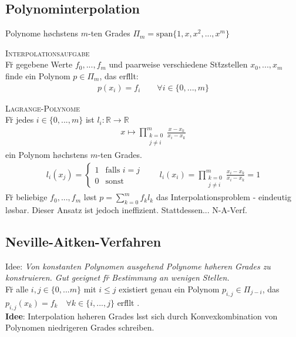 \subsection{Polynominterpolation}
Polynome h\o chstens $m$-ten Grades $\Pi_m = \text{span}\{1,x,x^2,...,x^m\}$

\textsc{Interpolationsaufgabe}\\
F\u r gegebene Werte $f_0, ..., f_m$ und paarweise verschiedene St\u tzstellen $x_0, ..., x_m$ finde ein Polynom $p \in \Pi_m$, das erf\u llt:
\begin{align*}
p(x_i)=f_i \qquad \forall i\in \{0,...,m\}
\end{align*}\vspace{0.2cm}

\textsc{Lagrange-Polynome}\\
F\u r jedes $i \in \{0,...,m\}$ ist $l_i : \mathbb{R} \rightarrow \mathbb{R}$
\begin{align*}
x \mapsto \prod_{\substack{k=0 \\ j\neq i}}^m \frac{x-x_k}{x_i - x_k}
\end{align*}
ein Polynom h\o chstens $m$-ten Grades. 
\begin{align*}
l_i(x_j) = \begin{cases}
1 & \text{falls } i=j \\
0 & \text{sonst}
\end{cases}
\qquad 
l_i(x_i) = \prod_{\substack{k=0 \\ j\neq i}}^m \frac{x_i-x_k}{x_i - x_k} = 1
\end{align*}
F\u r beliebige $f_0, ..., f_m$ l\o st $p=\sum_{k=0}^m f_kl_k$ das Interpolationsproblem - eindeutig l\o sbar. Dieser Ansatz ist jedoch ineffizient. 
Stattdessen... N-A-Verf.

\subsection{Neville-Aitken-Verfahren}
Idee: \emph{Von konstanten Polynomen ausgehend Polynome h\o heren Grades zu konstruieren. Gut geeignet f\u r Bestimmung an wenigen Stellen.}\\
F\u r alle $i,j \in \{0,...m\}$ mit $i\leq j$ existiert genau ein Polynom $p_{i,j} \in \Pi_{j-i}$, das $p_{i,j}(x_k) = f_k \quad \forall k \in \{i,...,j\}$ erf\u llt .\\
\textbf{Idee}: Interpolation h\o heren Grades l\a sst sich durch Konvexkombination von Polynomen niedrigeren Grades schreiben.\vspace{0.2cm}


